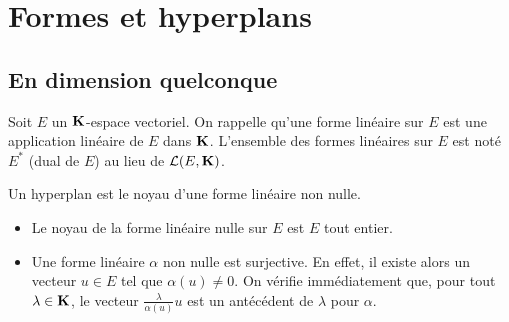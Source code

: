 \section{Formes et hyperplans}
\subsection{En dimension quelconque}
Soit $E$ un $\mathbf{K}$-espace vectoriel. On rappelle qu'une forme linéaire sur $E$ est une application linéaire de $E$ dans $\mathbf{K}$. L'ensemble des formes linéaires sur $E$ est noté $E^*$ (dual de $E$) au lieu de $\mathcal{L}(E,\mathbf{K})$.  
\begin{defi}[hyperplan]
Un hyperplan est le noyau d'une forme linéaire non nulle.  
\end{defi}
\begin{rems}
\begin{itemize}
  \item Le noyau de la forme linéaire nulle sur $E$ est $E$ tout entier.
  \item Une forme linéaire $\alpha$ non nulle est surjective. En effet, il existe alors un vecteur $u\in E$ tel que $\alpha(u)\neq 0$. On vérifie immédiatement que, pour tout $\lambda \in \mathbf{K}$, le vecteur $\frac{\lambda}{\alpha(u)}u$ est un antécédent de $\lambda$ pour $\alpha$.
\end{itemize}
\end{rems}

